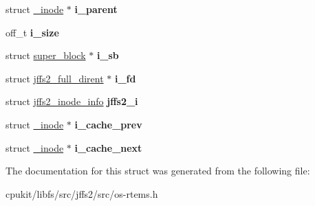 \begin{DoxyCompactItemize}
\item 
\mbox{\label{struct__inode_a972eacaddf01921c0a72e5064c70c7f9}} 
struct \mbox{\hyperlink{struct__inode}{\+\_\+inode}} $\ast$ {\bfseries i\+\_\+parent}
\item 
\mbox{\label{struct__inode_a6a9701e3a5fe9a3aeb13095e450db546}} 
off\+\_\+t {\bfseries i\+\_\+size}
\item 
\mbox{\label{struct__inode_a75a80672436e2c13455ea47aacf13d28}} 
struct \mbox{\hyperlink{structsuper__block}{super\+\_\+block}} $\ast$ {\bfseries i\+\_\+sb}
\item 
\mbox{\label{struct__inode_a30bde8b8507cf7b6b2c5f7d07e304e38}} 
struct \mbox{\hyperlink{structjffs2__full__dirent}{jffs2\+\_\+full\+\_\+dirent}} $\ast$ {\bfseries i\+\_\+fd}
\item 
\mbox{\label{struct__inode_a846462384fbf363267a1756b903e3776}} 
struct \mbox{\hyperlink{structjffs2__inode__info}{jffs2\+\_\+inode\+\_\+info}} {\bfseries jffs2\+\_\+i}
\item 
\mbox{\label{struct__inode_a19a4dc0e68011ac4a669933151994498}} 
struct \mbox{\hyperlink{struct__inode}{\+\_\+inode}} $\ast$ {\bfseries i\+\_\+cache\+\_\+prev}
\item 
\mbox{\label{struct__inode_aaf3ce1cdbdb28db83d91b3706e5cf705}} 
struct \mbox{\hyperlink{struct__inode}{\+\_\+inode}} $\ast$ {\bfseries i\+\_\+cache\+\_\+next}
\end{DoxyCompactItemize}


The documentation for this struct was generated from the following file\+:\begin{DoxyCompactItemize}
\item 
cpukit/libfs/src/jffs2/src/os-\/rtems.\+h\end{DoxyCompactItemize}
